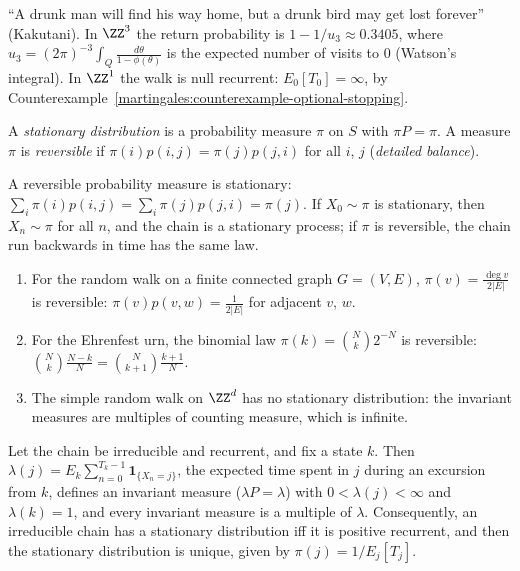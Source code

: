 \begin{remark}\label{martingales:remark-polya}
``A drunk man will find his way home, but a drunk bird may get lost forever'' (Kakutani). In $\ZZ^3$ the return probability is $1 - 1/u_3 \approx 0.3405$, where $u_3 = (2\pi)^{-3}\int_Q\frac{d\theta}{1 - \phi(\theta)}$ is the expected number of
visits to $0$ (Watson's integral). In $\ZZ^1$ the walk is null recurrent: $E_0[T_0] = \infty$, by Counterexample~\ref{martingales:counterexample-optional-stopping}.
\end{remark}

\begin{definition}\label{martingales:definition-stationary}
A \emph{stationary distribution} is a probability measure $\pi$ on $S$ with $\pi P = \pi$. A measure $\pi$ is \emph{reversible} if $\pi(i)p(i, j) = \pi(j)p(j, i)$ for all $i$, $j$ (\emph{detailed balance}).
\end{definition}

A reversible probability measure is stationary: $\sum_i\pi(i)p(i, j) = \sum_i\pi(j)p(j, i) = \pi(j)$. If $X_0 \sim \pi$ is stationary, then $X_n \sim \pi$ for all $n$, and the chain is a stationary process; if $\pi$ is reversible, the
chain run backwards in time has the same law.

\begin{example}\label{martingales:example-stationary}
\begin{enumerate}
\item For the random walk on a finite connected graph $G = (V, E)$, $\pi(v) = \frac{\deg v}{2|E|}$ is reversible: $\pi(v)p(v, w) = \frac{1}{2|E|}$ for adjacent $v$, $w$.
\item For the Ehrenfest urn, the binomial law $\pi(k) = \binom Nk2^{-N}$ is reversible: $\binom Nk\frac{N - k}{N} = \binom N{k+1}\frac{k + 1}{N}$.
\item The simple random walk on $\ZZ^d$ has no stationary distribution: the invariant measures are multiples of counting measure, which is infinite.
\end{enumerate}
\end{example}

\begin{theorem}\label{martingales:theorem-stationary}
Let the chain be irreducible and recurrent, and fix a state $k$. Then $\lambda(j) = E_k\sum_{n=0}^{T_k - 1}\mathbf{1}_{\{X_n = j\}}$, the expected time spent in $j$ during an excursion from $k$, defines an invariant measure ($\lambda P = \lambda$) with
$0 < \lambda(j) < \infty$ and $\lambda(k) = 1$, and every invariant measure is a multiple of $\lambda$. Consequently, an irreducible chain has a stationary distribution iff it is positive recurrent, and then the stationary distribution
is unique, given by $\pi(j) = 1/E_j[T_j]$.
\end{theorem}

